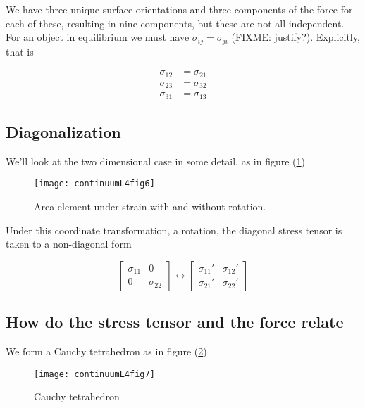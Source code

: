 We have three unique surface orientations and three components of the force for each of these, resulting in nine components, but these are not all independent.  For an object in equilibrium we must have $\sigma_{ij} = \sigma_{ji}$ (FIXME: justify?).  Explicitly, that is

\begin{align}\label{eqn:continuumL4:110}
\sigma_{12} &= \sigma_{21} \\
\sigma_{23} &= \sigma_{32} \\
\sigma_{31} &= \sigma_{13}
\end{align}

\subsection{Diagonalization}

We'll look at the two dimensional case in some detail, as in figure (\ref{fig:continuumL4:continuumL4fig6})

\begin{figure}[htp]
   \centering
   \texttt{[image: continuumL4fig6]}
   \caption{Area element under strain with and without rotation.}\label{fig:continuumL4:continuumL4fig6}
\end{figure}

Under this coordinate transformation, a rotation, the diagonal stress tensor is taken to a non-diagonal form

\begin{equation}\label{eqn:continuumL4:130}
\begin{bmatrix}
\sigma_{11} & 0 \\
0 & \sigma_{22} 
\end{bmatrix}
\leftrightarrow
\begin{bmatrix}
\sigma_{11}' & \sigma_{12}' \\
\sigma_{21}' & \sigma_{22}' 
\end{bmatrix}
\end{equation}

\subsection{How do the stress tensor and the force relate}

We form a Cauchy tetrahedron as in figure (\ref{fig:continuumL4:continuumL4fig7})
\begin{figure}[htp]
   \centering
   \texttt{[image: continuumL4fig7]}
   \caption{Cauchy tetrahedron}\label{fig:continuumL4:continuumL4fig7}
\end{figure}

